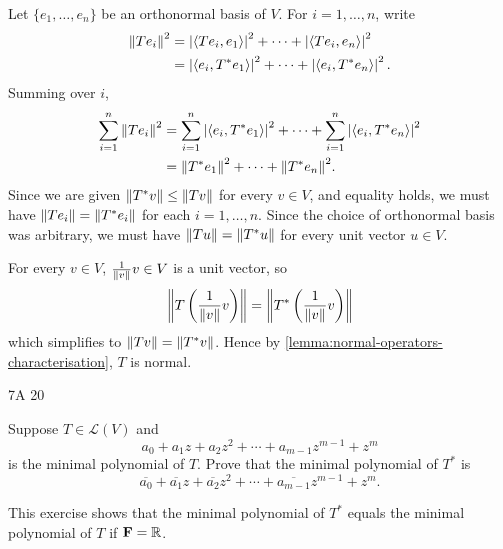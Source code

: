 \begin{solution}
Let $\{e_1,\dots,e_n\}$ be an orthonormal basis of $V$.
For $i=1,\dots,n$, write
\begin{align*}
\norm{Te_i}^2&=\left|\left\langle Te_i,e_1\right\rangle\right|^2+\cdots+\left|\left\langle Te_i,e_n\right\rangle\right|^2\\
&=\left|\left\langle e_i,T^*e_1\right\rangle\right|^2+\cdots+\left|\left\langle e_i,T^*e_n\right\rangle\right|^2.
\end{align*}
Summing over $i$,
\begin{align*}
\sum_{i=1}^{n}\norm{Te_i}^2
&=\sum_{i=1}^{n}\left|\left\langle e_i,T^*e_1\right\rangle\right|^2+\cdots+\sum_{i=1}^{n}\left|\left\langle e_i,T^*e_n\right\rangle\right|^2\\
&=\norm{T^*e_1}^2+\cdots+\norm{T^*e_n}^2.
\end{align*}
Since we are given $\norm{T^*v}\le\norm{Tv}$ for every $v\in V$, and equality holds, we must have $\norm{Te_i}=\norm{T^*e_i}$ for each $i=1,\dots,n$. Since the choice of orthonormal basis was arbitrary, we must have $\norm{Tu}=\norm{T^*u}$ for every unit vector $u\in V$.

For every $v\in V$, $\frac{1}{\norm{v}}v\in V$ is a unit vector, so
\[\norm{T\left(\frac{1}{\norm{v}}v\right)}=\norm{T^*\left(\frac{1}{\norm{v}}v\right)}\]
which simplifies to $\norm{Tv}=\norm{T^*v}$. Hence by \ref{lemma:normal-operators-characterisation}, $T$ is normal.
\end{solution}

7A 20

\begin{exercise}
Suppose $T\in\mathcal{L}(V)$ and
\[a_0+a_1z+a_2z^2+\cdots+a_{m-1}z^{m-1}+z^m\]
is the minimal polynomial of $T$. Prove that the minimal polynomial of $T^*$ is
\[\overline{a_0}+\overline{a_1}z+\overline{a_2}z^2+\cdots+\overline{a_{m-1}}z^{m-1}+z^m.\]
\end{exercise}

\begin{remark}
This exercise shows that the minimal polynomial of $T^*$ equals the minimal polynomial of $T$ if $\mathbf F=\mathbb R$.
\end{remark}

